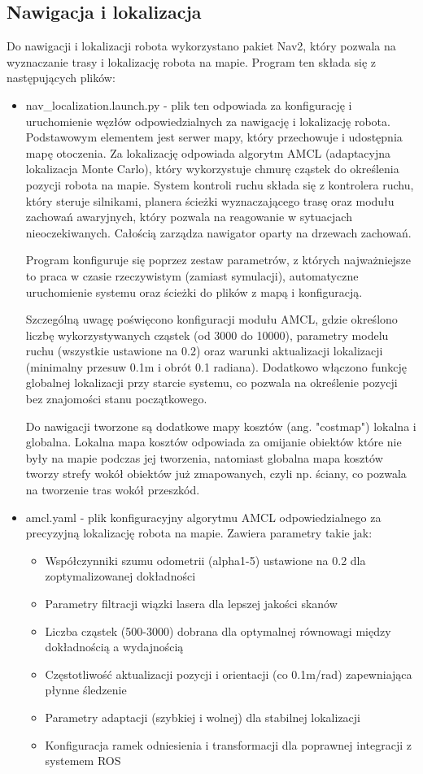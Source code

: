 \documentclass[a4paper,twoside,12pt]{book}
\begin{document}
\subsection{Nawigacja i lokalizacja}
Do nawigacji i lokalizacji robota wykorzystano pakiet Nav2, który pozwala na wyznaczanie trasy i lokalizację robota na mapie. Program ten składa się z następujących plików:
\begin{itemize}
	\item nav\_localization.launch.py - plik ten odpowiada za konfigurację i uruchomienie węzłów odpowiedzialnych za nawigację i lokalizację robota. 
	 Podstawowym elementem jest serwer mapy, który przechowuje i udostępnia mapę otoczenia. Za lokalizację odpowiada algorytm AMCL (adaptacyjna lokalizacja Monte Carlo), który wykorzystuje chmurę cząstek do określenia pozycji robota na mapie. System kontroli ruchu składa się z kontrolera ruchu, który steruje silnikami, planera ścieżki wyznaczającego trasę oraz modułu zachowań awaryjnych, który pozwala na reagowanie w sytuacjach nieoczekiwanych. Całością zarządza nawigator oparty na drzewach zachowań.

	Program konfiguruje się poprzez zestaw parametrów, z których najważniejsze to praca w czasie rzeczywistym (zamiast symulacji), automatyczne uruchomienie systemu oraz ścieżki do plików z mapą i konfiguracją. 

	Szczególną uwagę poświęcono konfiguracji modułu AMCL, gdzie określono liczbę wykorzystywanych cząstek (od 3000 do 10000), parametry modelu ruchu (wszystkie ustawione na 0.2) oraz warunki aktualizacji lokalizacji (minimalny przesuw 0.1m i obrót 0.1 radiana). Dodatkowo włączono funkcję globalnej lokalizacji przy starcie systemu, co pozwala na określenie pozycji bez znajomości stanu początkowego.

	Do nawigacji tworzone są dodatkowe mapy kosztów (ang. "costmap") lokalna i globalna. Lokalna mapa kosztów odpowiada za omijanie obiektów które nie były na mapie podczas jej tworzenia, natomiast globalna mapa kosztów tworzy strefy wokół obiektów już zmapowanych, czyli np. ściany, co pozwala na tworzenie tras wokół przeszkód.
	\newpage
	\item amcl.yaml - plik konfiguracyjny algorytmu AMCL odpowiedzialnego 
	za precyzyjną lokalizację robota na mapie. Zawiera parametry takie jak:
	\begin{itemize}
		\item Współczynniki szumu odometrii (alpha1-5) ustawione na 0.2 dla zoptymalizowanej dokładności
		\item Parametry filtracji wiązki lasera dla lepszej jakości skanów
		\item Liczba cząstek (500-3000) dobrana dla optymalnej równowagi między dokładnością a wydajnością
		\item Częstotliwość aktualizacji pozycji i orientacji (co 0.1m/rad) zapewniająca płynne śledzenie
		\item Parametry adaptacji (szybkiej i wolnej) dla stabilnej lokalizacji
		\item Konfiguracja ramek odniesienia i transformacji dla poprawnej integracji z systemem ROS
	\end{itemize}
	\end{itemize}
\newpage
\end{document}
